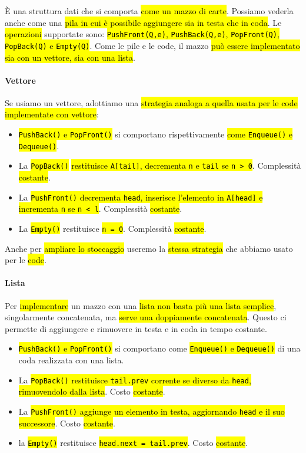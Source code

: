 \documentclass[a4paper,11pt,oneside]{article}
\theoremstyle{plain}
\theoremstyle{definition}
\theoremstyle{remark}
\begin{document}
È una struttura dati che si comporta \hl{come un mazzo di carte}. Possiamo
vederla anche come una \hl{pila in cui è possibile aggiungere sia in testa che
in coda}. Le \hl{operazioni} supportate sono: \hl{\texttt{PushFront(Q,e)},
\texttt{PushBack(Q,e)}, \texttt{PopFront(Q)}, \texttt{PopBack(Q)} e
\texttt{Empty(Q)}}. Come le pile e le code, il mazzo \hl{può essere implementato
sia con un vettore, sia con una lista}.

\paragraph{Vettore} Se usiamo un vettore, adottiamo una \hl{strategia analoga a
quella usata per le code implementate con vettore}:

\begin{itemize}
  \item \hl{\texttt{PushBack()} e \texttt{PopFront()}} si comportano
    rispettivamente \hl{come \texttt{Enqueue()} e \texttt{Dequeue()}}.
  \item La \hl{\texttt{PopBack()}} \hl{restituisce \texttt{A[tail]}, decrementa
    \texttt{n} e \texttt{tail} se \texttt{n > 0}}. Complessità \hl{costante}.
  \item La \hl{\texttt{PushFront()} decrementa \texttt{head}, inserisce
    l'elemento in \texttt{A[head]} e incrementa \texttt{n} se \texttt{n < l}}.
    Complessità \hl{costante}.
  \item La \hl{\texttt{Empty()}} restituisce \hl{\texttt{n = 0}}. Complessità
    \hl{costante}.
\end{itemize}

\noindent Anche per \hl{ampliare lo stoccaggio} useremo la \hl{stessa strategia}
che abbiamo usato per le \hl{code}.

\paragraph{Lista} Per \hl{implementare} un mazzo con una \hl{lista non basta più
una lista semplice}, singolarmente concatenata, ma \hl{serve una doppiamente
concatenata}. Questo ci permette di aggiungere e rimuovere in testa e in coda in
tempo costante.

\begin{itemize}
  \item \hl{\texttt{PushBack()} e \texttt{PopFront()}} si comportano come
    \hl{\texttt{Enqueue()} e \texttt{Dequeue()}} di una coda realizzata con una
    lista.
  \item La \hl{\texttt{PopBack()} restituisce \texttt{tail.prev} corrente se
    diverso da \texttt{head}, rimuovendolo dalla lista}. Costo \hl{costante}.
  \item La \hl{\texttt{PushFront()} aggiunge un elemento in testa, aggiornando
    \texttt{head} e il suo successore}. Costo \hl{costante}.
  \item la \hl{\texttt{Empty()}} restituisce \hl{\texttt{head.next =
    tail.prev}}. Costo \hl{costante}.
\end{itemize}
\end{document}

